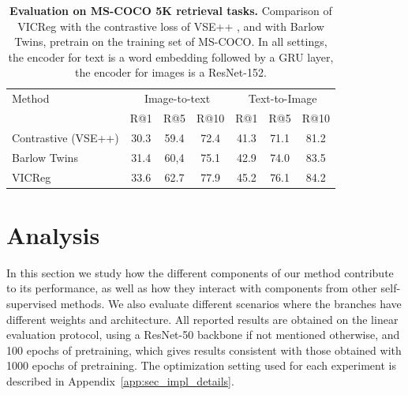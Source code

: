 \documentclass{article} %
\begin{document}
\begin{table}[t]
\caption{\textbf{Evaluation on MS-COCO 5K retrieval tasks.} Comparison of VICReg with the contrastive loss of VSE++ \cite{faghri2018vse}, and with Barlow Twins, pretrain on the training set of MS-COCO. In all settings, the encoder for text is a word embedding followed by a GRU layer, the encoder for images is a ResNet-152.}
\label{tab:retrieval}
\vspace{-1.5em}
\setlength{\tabcolsep}{10.5pt}
\vskip 0.15in
\begin{center}
\begin{tabular}{lcccccc}
\toprule
Method & \multicolumn{3}{c}{Image-to-text} &  \multicolumn{3}{c}{Text-to-Image} \\
                & R@1 & R@5 & R@10 & R@1 & R@5 & R@10 \\
\midrule
Contrastive (VSE++) &	30.3	& 59.4 &72.4	&41.3&	71.1&	81.2 \\
Barlow Twins	&31.4	&60,4	&75.1&	42.9	&74.0&	83.5 \\
VICReg	&33.6&	62.7&	77.9	&45.2&	76.1&	84.2 \\
\bottomrule
\end{tabular}
\end{center}
\vspace{-2mm}
\end{table}


\section{Analysis} \label{sec:ablations}
In this section we study how the different components of our method contribute to its performance, as well as how they interact with components from other self-supervised methods. We also evaluate different scenarios where the branches have different weights and architecture. All reported results are obtained on the linear evaluation protocol, using a ResNet-50 backbone if not mentioned otherwise, and 100 epochs of pretraining, which gives results consistent with those obtained with 1000 epochs of pretraining. The optimization setting used for each experiment is described in Appendix~\ref{app:sec_impl_details}.
\end{document}
